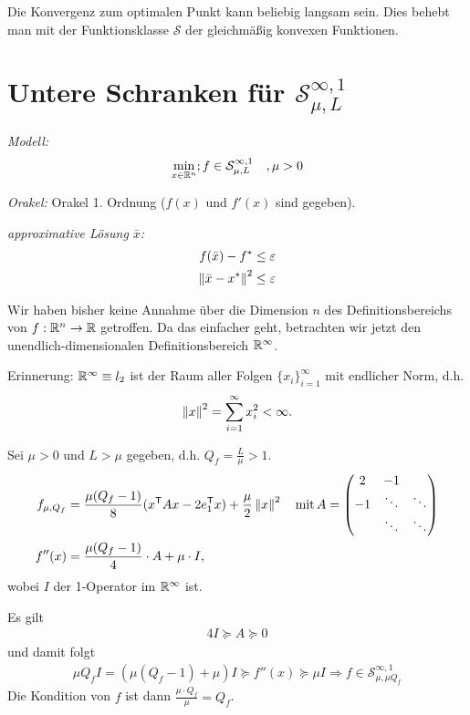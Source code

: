 \begin{Bemerkung}
Die Konvergenz zum optimalen Punkt kann beliebig langsam sein.
Dies behebt man mit der Funktionsklasse $\mathcal{S}$ der gleichmäßig konvexen Funktionen.
\end{Bemerkung}

\section{Untere Schranken für $\mathcal{S}_{\mu, L}^{\infty, 1}$}
\textit{Modell:}
\begin{align*}
\min_{x \in \mathbb R^n}; f \in \mathcal{S}_{\mu, L}^{\infty, 1} \quad , \mu > 0
\end{align*}

\textit{Orakel:} Orakel 1. Ordnung ($f(x)$ und $f'(x)$ sind gegeben).

\textit{approximative Lösung $\bar{x}$:}
\begin{align*}
f(\bar{x}) - f^* &\leq \varepsilon\\
\left\lVert\bar{x} - x^*\right\rVert^2 &\leq \varepsilon
\end{align*}

Wir haben bisher keine Annahme über die Dimension $n$ des Definitionsbereichs von ${f:\mathbb R^n \rightarrow \mathbb R}$ getroffen.
Da das einfacher geht, betrachten wir jetzt den unendlich-dimensionalen Definitionsbereich $\mathbb R^\infty$.

Erinnerung: $\mathbb R^\infty \equiv l_2$ ist der Raum aller Folgen $\lbrace x_i \rbrace_{i = 1}^\infty$ mit endlicher Norm, d.h.
\begin{align*}
\left\lVert x\right\rVert^2 = \sum_{i = 1}^{\infty} x_i^2 < \infty.
\end{align*}

Sei $\mu > 0$ und $L > \mu$ gegeben, d.h. $Q_f = \frac{L}{\mu} > 1$.
\begin{align*}
f_{\mu, Q_f} &= \frac{\mu(Q_f - 1)}{8}(x^\mathsf{T} Ax-2e_1^\mathsf{T} x)+\frac{\mu}{2}\left\lVert x\right\rVert^2
\quad \text{mit}\,A =
\begin{pmatrix}
2 & -1 & \\
-1 & \ddots & \ddots\\
 & \ddots & \ddots\\
\end{pmatrix}\\
f''(x) &= \frac{\mu(Q_f - 1)}{4} \cdot A + \mu \cdot I,
\end{align*}
wobei $I$ der 1-Operator im $\mathbb R^\infty$ ist.

Es gilt
\begin{align*}
4 I \succeq A \succeq 0
\end{align*}
und damit folgt
\begin{align*}
\mu  Q_f I = (\mu (Q_f - 1) + \mu) I \succeq f''(x) \succeq \mu I
\Longrightarrow f \in \mathcal{S}_{\mu, \mu Q_f}^{\infty, 1}
\end{align*}
Die Kondition von $f$ ist dann $\frac{\mu \cdot Q_f}{\mu} = Q_f$.

